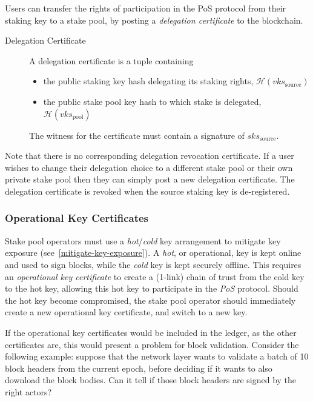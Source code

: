 \documentclass[11pt,a4paper,dvipsnames,twosided]{article}
\begin{document}
Users can transfer the rights of participation in the PoS protocol from
their staking key to a stake pool, by posting a \emph{delegation
certificate} to the blockchain.

\begin{description}
\item[Delegation Certificate]
A delegation certificate is a tuple containing

\begin{itemize}
\item
  the public staking key hash delegating its staking rights,
  \(\mathcal{H}(vks_\text{source})\)
\item
  the public stake pool key hash to which stake is delegated,
  \(\mathcal{H}(vks_\text{pool})\)
\end{itemize}

The witness for the certificate must contain a signature of
\(sks_\text{source}\).
\end{description}

Note that there is no corresponding delegation revocation certificate.
If a user wishes to change their delegation choice to a different stake
pool or their own private stake pool then they can simply post a new
delegation certificate. The delegation certificate is revoked when the
source staking key is de-registered.

\subsubsection{Operational Key Certificates}
\label{operational-key-certificates}

Stake pool operators must use a \emph{hot}/\emph{cold} key
arrangement to mitigate key exposure
(see~\cref{mitigate-key-exposure}). A \emph{hot}, or operational, key
is kept online and used to sign blocks, while the \emph{cold} key is
kept securely offline. This requires an \emph{operational key
  certificate} to create a (1-link) chain of trust from the cold key
to the hot key, allowing this hot key to participate in the \emph{PoS}
protocol. Should the hot key become compromised, the stake pool
operator should immediately create a new operational key certificate, and
switch to a new key.

If the operational key certificates would be included in the ledger,
as the other certificates are, this would present a problem for block
validation. Consider the following example: suppose that the network
layer wants to validate a batch of 10 block headers from the current
epoch, before deciding if it wants to also download the block
bodies. Can it tell if those block headers are signed by the right
actors?
\end{document}
